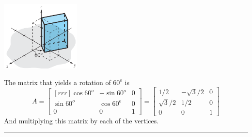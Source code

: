 \documentclass{article}
\begin{document}
    \begin{minipage}{0.3\linewidth}
        \includegraphics[width = 4cm]{images/60rotateZ.png}
    \end{minipage}
    \begin{minipage}{0.61\linewidth}
        The matrix that yields a rotation of $60^o$ is
        \[A = \begin{bmatrix}[rrr]
            \cos{ 60^o} & - \sin{60^o } & 0 \\
            \sin{ 60^o} & \cos{60^o } & 0 \\
            0 & 0 & 1
        \end{bmatrix} = \begin{bmatrix}
            1/2 & -\sqrt{3}/2 & 0 \\
            \sqrt{3}/2 & 1/2 & 0 \\
            0 & 0 & 1
        \end{bmatrix} \]
        And multiplying this matrix by each of the vertices.
    \end{minipage}

    {\color{blue9} \rule{10cm}{0.3mm}}
    
\end{document}
